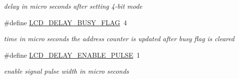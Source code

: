 \begin{DoxyCompactItemize}
\begin{DoxyCompactList}\small\item\em delay in micro seconds after setting 4-\/bit mode \end{DoxyCompactList}\item 
\#define \hyperlink{group__pfleury__lcd_ga73b2370827e2d350cedd45e08a9eb0b2}{L\+C\+D\+\_\+\+D\+E\+L\+A\+Y\+\_\+\+B\+U\+S\+Y\+\_\+\+F\+L\+AG}~4\hypertarget{group__pfleury__lcd_ga73b2370827e2d350cedd45e08a9eb0b2}{}\label{group__pfleury__lcd_ga73b2370827e2d350cedd45e08a9eb0b2}

\begin{DoxyCompactList}\small\item\em time in micro seconds the address counter is updated after busy flag is cleared \end{DoxyCompactList}\item 
\#define \hyperlink{group__pfleury__lcd_ga5b0632f09757ffe6f018c6ef88cc3296}{L\+C\+D\+\_\+\+D\+E\+L\+A\+Y\+\_\+\+E\+N\+A\+B\+L\+E\+\_\+\+P\+U\+L\+SE}~1\hypertarget{group__pfleury__lcd_ga5b0632f09757ffe6f018c6ef88cc3296}{}\label{group__pfleury__lcd_ga5b0632f09757ffe6f018c6ef88cc3296}

\begin{DoxyCompactList}\small\item\em enable signal pulse width in micro seconds \end{DoxyCompactList}\end{DoxyCompactItemize}
